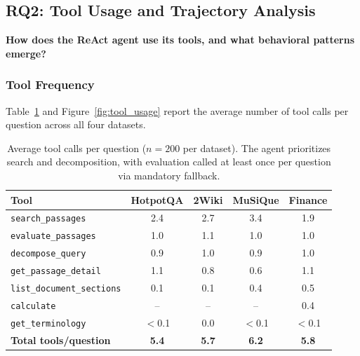 \subsection{RQ2: Tool Usage and Trajectory Analysis}
\label{subsec:rq2}

\textbf{How does the ReAct agent use its tools, and what behavioral patterns emerge?}

\subsubsection{Tool Frequency}
\label{subsubsec:tool_freq}

Table~\ref{tab:tool_usage} and Figure~\ref{fig:tool_usage} report the average number of tool calls per question across all four datasets.



\begin{table}[t]
\centering
\caption{Average tool calls per question ($n = 200$ per dataset). The agent prioritizes search and decomposition, with evaluation called at least once per question via mandatory fallback.}
\label{tab:tool_usage}
\begin{tabular}{lcccc}
\toprule
\textbf{Tool} & \textbf{HotpotQA} & \textbf{2Wiki} & \textbf{MuSiQue} & \textbf{Finance} \\
\midrule
\texttt{search\_passages}          & 2.4 & 2.7 & 3.4 & 1.9 \\
\texttt{evaluate\_passages}        & 1.0 & 1.1 & 1.0 & 1.0 \\
\texttt{decompose\_query}          & 0.9 & 1.0 & 0.9 & 1.0 \\
\texttt{get\_passage\_detail}      & 1.1 & 0.8 & 0.6 & 1.1 \\
\texttt{list\_document\_sections}  & 0.1 & 0.1 & 0.4 & 0.5 \\
\texttt{calculate}                 & --  & --  & --  & 0.4 \\
\texttt{get\_terminology}          & $<$0.1 & 0.0 & $<$0.1 & $<$0.1 \\
\midrule
\textbf{Total tools/question} & \textbf{5.4} & \textbf{5.7} & \textbf{6.2} & \textbf{5.8} \\
\bottomrule
\end{tabular}
\end{table}

